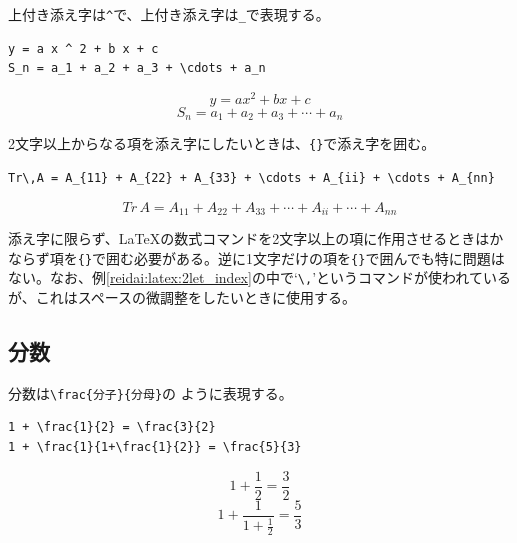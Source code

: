 上付き添え字は\texttt{\^}で、上付き添え字は\texttt{\_}で表現する。
\begin{reidai}
\begin{verbatim}
y = a x ^ 2 + b x + c
S_n = a_1 + a_2 + a_3 + \cdots + a_n
\end{verbatim}
\end{reidai}
\vspace*{-1.5em}
\begin{kekka}
  \begin{equation*}
    y = a x ^ 2 + b x + c
  \end{equation*}
  \begin{equation*}
    S_n = a_1 + a_2 + a_3 + \cdots + a_n
  \end{equation*}
  \vspace{0pt}
\end{kekka} \noindent
2文字以上からなる項を添え字にしたいときは、\verb|{}|で添え字を囲む。
\begin{reidai}
\label{reidai:latex:2let_index}
\begin{verbatim}
Tr\,A = A_{11} + A_{22} + A_{33} + \cdots + A_{ii} + \cdots + A_{nn}
\end{verbatim}
\end{reidai}
\vspace*{-1.5em}
\begin{kekka}
  \begin{equation*}
    Tr\,A = A_{11} + A_{22} + A_{33} + \cdots + A_{ii} + \cdots + A_{nn}
  \end{equation*}
  \vspace{0pt}
\end{kekka} \noindent
添え字に限らず、\LaTeX の数式コマンドを2文字以上の項に作用させるときはかならず項を\verb|{}|で囲む必要がある。逆に1文字だけの項を\verb|{}|で囲んでも特に問題はない。なお、例\ref{reidai:latex:2let_index}の中で`\verb|\,|'というコマンドが使われているが、これはスペースの微調整をしたいときに使用する。

\subsection{分数}
\label{sec:latex:frac}

分数は\texttt{\textbackslash frac\{\textrm{分子}\}\{\textrm{分母}\}}の
ように表現する。
\begin{reidai}
\begin{verbatim}
1 + \frac{1}{2} = \frac{3}{2}
1 + \frac{1}{1+\frac{1}{2}} = \frac{5}{3}
\end{verbatim}
\end{reidai}
\vspace*{-1.5em}
\begin{kekka}
  \begin{equation*}
    1 + \frac{1}{2} = \frac{3}{2}
  \end{equation*}
  \begin{equation*}
    1 + \frac{1}{1+\frac{1}{2}} = \frac{5}{3}
  \end{equation*}
\end{kekka}

